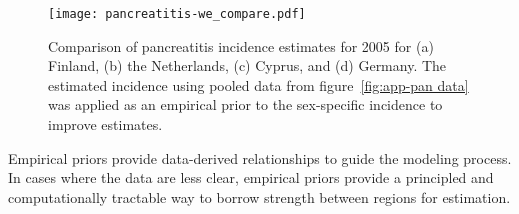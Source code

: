     \begin{figure}[h]
        \begin{center}
            \texttt{[image: pancreatitis-we\_compare.pdf]}
            \caption[Comparison of pancreatitis incidence estimates
              for 2005.]{Comparison of pancreatitis incidence estimates
              for 2005 for (a) Finland, (b) the Netherlands, (c)
              Cyprus, and (d) Germany.  The estimated incidence using
              pooled data from figure~\ref{fig:app-pan data} was
              applied as an empirical prior to the sex-specific
              incidence to improve estimates.}
            \label{fig:app-pan compare}
        \end{center}
    \end{figure}

Empirical priors provide data-derived relationships to guide the
modeling process.  In cases where the data are less clear, empirical
priors provide a principled and computationally tractable way to
borrow strength between regions for estimation.
